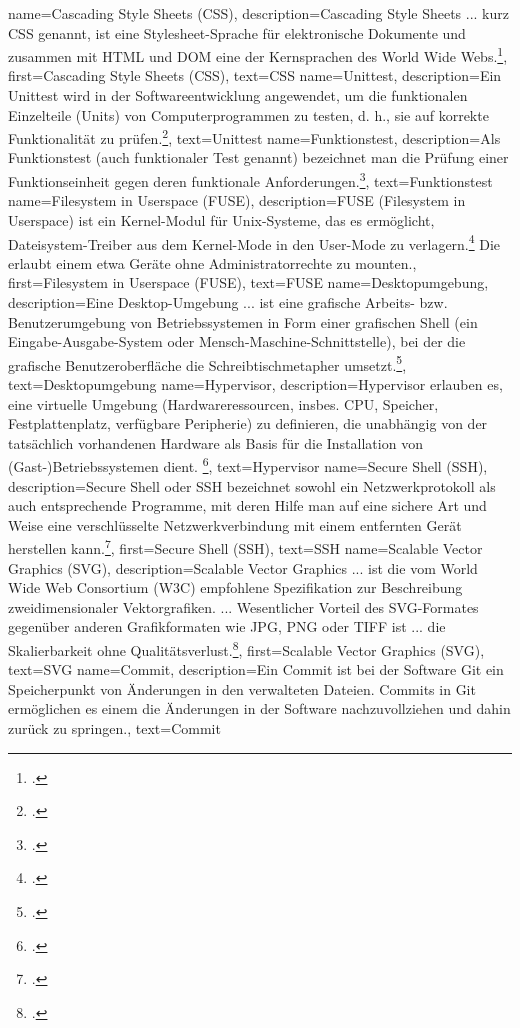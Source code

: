 {
    name={Cascading Style Sheets (CSS)},
    description={Cascading Style Sheets ... kurz CSS genannt, ist
      eine Stylesheet-Sprache für elektronische Dokumente und zusammen mit HTML und
      DOM eine der Kernsprachen des World Wide Webs.\footcite{css}},
    first={Cascading Style Sheets (CSS)},
    text={CSS}
}
{
    name={Unittest},
    description={Ein Unittest wird in der Softwareentwicklung angewendet, um
      die funktionalen Einzelteile (Units) von Computerprogrammen zu testen, d. h.,
      sie auf korrekte Funktionalität zu prüfen.\footcite{unittest}},
    text={Unittest}
}
{
    name={Funktionstest},
    description={Als Funktionstest (auch funktionaler Test genannt) bezeichnet
      man die Prüfung einer Funktionseinheit gegen deren funktionale
      Anforderungen.\footcite{funktionstest}},
    text={Funktionstest}
}
{
    name={Filesystem in Userspace (FUSE)},
    description={FUSE (Filesystem in Userspace) ist ein Kernel-Modul für
      Unix-Systeme, das es ermöglicht, Dateisystem-Treiber aus dem Kernel-Mode in den
      User-Mode zu verlagern.\footcite{fuse} Die erlaubt einem etwa Geräte ohne
      Administratorrechte zu mounten.},
    first={Filesystem in Userspace (FUSE)},
    text={FUSE}
}
{
    name={Desktopumgebung},
    description={Eine Desktop-Umgebung ... ist eine grafische Arbeits- bzw.
      Benutzerumgebung von Betriebssystemen in Form einer grafischen Shell (ein
      Eingabe-Ausgabe-System oder Mensch-Maschine-Schnittstelle), bei der die
      grafische Benutzeroberfläche die Schreibtischmetapher
      umsetzt.\footcite{desktopumgebung}},
    text={Desktopumgebung}
}
{
    name={Hypervisor},
    description={Hypervisor erlauben es, eine virtuelle Umgebung
      (Hardwareressourcen, insbes. CPU, Speicher, Festplattenplatz, verfügbare
      Peripherie) zu definieren, die unabhängig von der tatsächlich vorhandenen
      Hardware als Basis für die Installation von (Gast-)Betriebssystemen
      dient. \footcite{hypervisor}},
    text={Hypervisor}
}
{
    name={Secure Shell (SSH)},
    description={Secure Shell oder SSH bezeichnet sowohl ein Netzwerkprotokoll
      als auch entsprechende Programme, mit deren Hilfe man auf eine sichere Art und
      Weise eine verschlüsselte Netzwerkverbindung mit einem entfernten Gerät
      herstellen kann.\footcite{ssh}},
    first={Secure Shell (SSH)},
    text={SSH}
}
{
    name={Scalable Vector Graphics (SVG)},
    description={Scalable Vector Graphics ... ist die vom World Wide Web
      Consortium (W3C) empfohlene Spezifikation zur Beschreibung
      zweidimensionaler Vektorgrafiken. ... Wesentlicher Vorteil des
      SVG-Formates gegenüber anderen Grafikformaten wie JPG, PNG oder TIFF ist
      ... die Skalierbarkeit ohne Qualitätsverlust.\footcite{svg}},
    first={Scalable Vector Graphics (SVG)},
    text={SVG}
}
{
    name={Commit},
    description={Ein Commit ist bei der Software Git ein Speicherpunkt von
      Änderungen in den verwalteten Dateien. Commits in Git ermöglichen es
      einem die Änderungen in der Software nachzuvollziehen und dahin zurück zu
      springen.},
    text={Commit}
}

